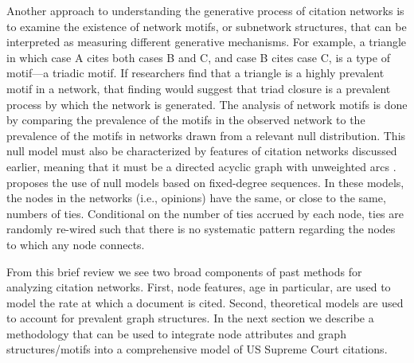 \documentclass[headsepline=true, abstracton]{scrartcl}
\begin{document}
Another approach to understanding the generative process of citation networks is to examine the existence of network motifs, or subnetwork structures, that can be interpreted as measuring different generative mechanisms. For example, a triangle in which case A cites both cases B and C, and case B cites case C, is a type of motif---a triadic motif. If researchers find that a triangle is a highly prevalent motif in a network, that finding would suggest that triad closure is a prevalent process by which the network is generated. The analysis of network motifs is done by comparing the prevalence of the motifs in the observed network to the prevalence of the motifs in networks drawn from a relevant null distribution. This null model must also be characterized by features of citation networks discussed earlier, meaning that it must be a directed acyclic graph with unweighted arcs \citep{carstens2016topology}. \citet{karrer2009random} proposes the use of null models based on fixed-degree sequences. In these models, the nodes in the networks (i.e., opinions) have the same, or close to the same, numbers of ties. Conditional on the number of ties accrued by each node, ties are randomly re-wired such that there is no systematic pattern regarding the nodes to which any node connects. 

From this brief review we see two broad components of past methods for analyzing citation networks. First, node features, age in particular, are used to model the rate at which a document is cited. Second, theoretical models are used to account for prevalent graph structures. In the next section we describe a methodology that can be used to integrate node attributes and graph structures/motifs into a comprehensive model of US Supreme Court citations. 	


 
\end{document}
